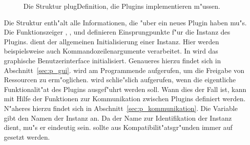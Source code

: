 \begin{figure}[htb]
  \begin{center}
    \begin{small}
    \end{small}
  \end{center}
  \caption[Die Struktur plugDefinition]
  {Die Struktur plugDefinition, die Plugins implementieren m"ussen.}
  \label{fig:p_plugdef}
\end{figure}

Die Struktur  enth"alt alle Informationen, die
\icewing{} "uber ein neues Plugin haben mu"s. Die Funktionszeiger
, ,  und
 definieren Einsprungpunkte f"ur die Instanz des
Plugins.  dient der allgemeinen Initialisierung einer
Instanz. Hier werden beispielsweise auch Kommandozeilenargumente
verarbeitet. In  wird das graphische
Benutzerinterface initialisiert. Genaueres hierzu findet sich in
Abschnitt~\ref{sec:p_gui}.  wird am Programmende
aufgerufen, um die Freigabe von Ressourcen zu
erm"oglichen.  wird schlie"slich aufgerufen, wenn die
eigentliche Funktionalit"at des Plugins ausgef"uhrt werden
soll. Wann dies der Fall ist, kann mit Hilfe der Funktionen zur
Kommunikation zwischen Plugins definiert werden. N"aheres hierzu
findet sich in Abschnitt~\ref{sec:p_kommunikation}. Die Variable
 gibt den Namen der Instanz an. Da der Name zur
Identifikation der Instanz dient, mu"s er eindeutig sein. 
sollte aus Kompatibilit"atsgr"unden immer auf 
gesetzt werden.

